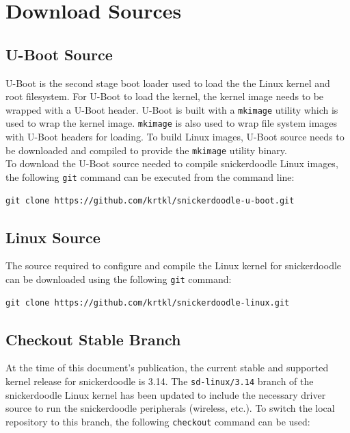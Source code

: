 \section{Download Sources}


\subsection{U-Boot Source}
U-Boot is the second stage boot loader used to load the the Linux kernel and root filesystem. For U-Boot to load the kernel, the kernel image needs to be wrapped with a U-Boot header. U-Boot is built with a \texttt{mkimage} utility which is used to wrap the kernel image. \texttt{mkimage} is also used to wrap file system images with U-Boot headers for loading. To build Linux images, U-Boot source needs to be downloaded and compiled to provide the \texttt{mkimage} utility binary. \\

\noindent
To download the U-Boot source needed to compile snickerdoodle Linux images, the following \texttt{git} command can be executed from the command line: \\

\begin{lstlisting}[style=text]
git clone https://github.com/krtkl/snickerdoodle-u-boot.git
\end{lstlisting}


\subsection{Linux Source}
The source required to configure and compile the Linux kernel for snickerdoodle can be downloaded using the following \texttt{git} command: \\

\begin{lstlisting}[style=text]
git clone https://github.com/krtkl/snickerdoodle-linux.git
\end{lstlisting}


\subsection{Checkout Stable Branch}
At the time of this document's publication, the current stable and supported kernel release for snickerdoodle is 3.14. The \texttt{sd-linux/3.14} branch of the snickerdoodle Linux kernel has been updated to include the necessary driver source to run the snickerdoodle peripherals (wireless, etc.). To switch the local repository to this branch, the following \texttt{checkout} command can be used: \\

